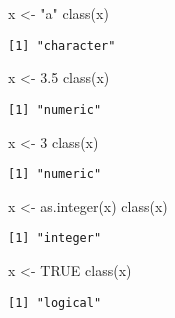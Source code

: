 \documentclass[
  letterpaper,
  DIV=11,
  numbers=noendperiod]{scrreprt}
\newenvironment{Shaded}{\begin{snugshade}}{\end{snugshade}}
\newcommand{\ConstantTok}[1]{\textcolor[rgb]{0.56,0.35,0.01}{#1}}
\newcommand{\DecValTok}[1]{\textcolor[rgb]{0.68,0.00,0.00}{#1}}
\newcommand{\FloatTok}[1]{\textcolor[rgb]{0.68,0.00,0.00}{#1}}
\newcommand{\FunctionTok}[1]{\textcolor[rgb]{0.28,0.35,0.67}{#1}}
\newcommand{\NormalTok}[1]{\textcolor[rgb]{0.00,0.23,0.31}{#1}}
\newcommand{\OtherTok}[1]{\textcolor[rgb]{0.00,0.23,0.31}{#1}}
\newcommand{\StringTok}[1]{\textcolor[rgb]{0.13,0.47,0.30}{#1}}
\begin{document}
\begin{Shaded}
\begin{Highlighting}[]
\NormalTok{x }\OtherTok{\textless{}{-}} \StringTok{"a"}  
\FunctionTok{class}\NormalTok{(x)}
\end{Highlighting}
\end{Shaded}

\begin{verbatim}
[1] "character"
\end{verbatim}

\begin{Shaded}
\begin{Highlighting}[]
\NormalTok{x }\OtherTok{\textless{}{-}} \FloatTok{3.5}  
\FunctionTok{class}\NormalTok{(x)}
\end{Highlighting}
\end{Shaded}

\begin{verbatim}
[1] "numeric"
\end{verbatim}

\begin{Shaded}
\begin{Highlighting}[]
\NormalTok{x }\OtherTok{\textless{}{-}} \DecValTok{3}  
\FunctionTok{class}\NormalTok{(x)}
\end{Highlighting}
\end{Shaded}

\begin{verbatim}
[1] "numeric"
\end{verbatim}

\begin{Shaded}
\begin{Highlighting}[]
\NormalTok{x }\OtherTok{\textless{}{-}} \FunctionTok{as.integer}\NormalTok{(x)}
\FunctionTok{class}\NormalTok{(x)}
\end{Highlighting}
\end{Shaded}

\begin{verbatim}
[1] "integer"
\end{verbatim}

\begin{Shaded}
\begin{Highlighting}[]
\NormalTok{x }\OtherTok{\textless{}{-}} \ConstantTok{TRUE}  
\FunctionTok{class}\NormalTok{(x)}
\end{Highlighting}
\end{Shaded}

\begin{verbatim}
[1] "logical"
\end{verbatim}
\end{document}
